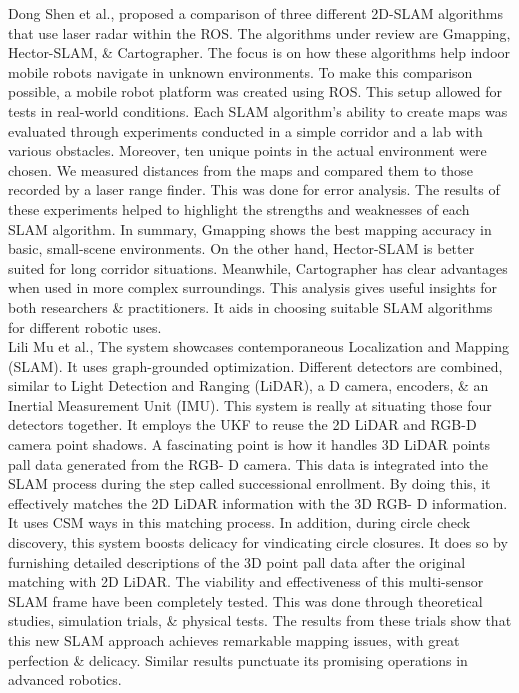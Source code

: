 {		Dong Shen et al., proposed a comparison of three different 2D-SLAM algorithms that use
		laser radar within the ROS. The algorithms under review are Gmapping, Hector-SLAM, \&
		Cartographer. The focus is on how these algorithms help indoor mobile robots navigate in
		unknown environments. To make this comparison possible, a mobile robot platform was
		created using ROS. This setup allowed for tests in real-world conditions. Each SLAM
		algorithm's ability to create maps was evaluated through experiments conducted in a simple
		corridor and a lab with various obstacles. Moreover, ten unique points in the actual
		environment were chosen. We measured distances from the maps and compared them to those
		recorded by a laser range finder. This was done for error analysis. The results of these
		experiments helped to highlight the strengths and weaknesses of each SLAM algorithm. In
		summary, Gmapping shows the best mapping accuracy in basic, small-scene environments. On
		the other hand, Hector-SLAM is better suited for long corridor situations. Meanwhile,
		Cartographer has clear advantages when used in more complex surroundings. This analysis
		gives useful insights for both researchers \& practitioners. It aids in choosing suitable SLAM
		algorithms for different robotic uses. \cite{3351966}\\
		
		Lili Mu et al., The system showcases contemporaneous Localization and Mapping (SLAM).
		It uses graph-grounded optimization. Different detectors are combined, similar to Light
		Detection and Ranging (LiDAR), a D camera, encoders, \& an Inertial Measurement Unit
		(IMU). This system is really at situating those four detectors together. It employs the UKF to
		reuse the 2D LiDAR and RGB-D camera point shadows. A fascinating point is how it handles
		3D LiDAR points pall data generated from the RGB- D camera. This data is integrated into the
		SLAM process during the step called successional enrollment. By doing this, it effectively
		matches the 2D LiDAR information with the 3D RGB- D information. It uses CSM ways in
		this matching process. In addition, during circle check discovery, this system boosts delicacy
		for vindicating circle closures. It does so by furnishing detailed descriptions of the 3D point
		pall data after the original matching with 2D LiDAR. The viability and effectiveness of this
		multi-sensor SLAM frame have been completely tested. This was done through theoretical
		studies, simulation trials, \& physical tests. The results from these trials show that this new
		SLAM approach achieves remarkable mapping issues, with great perfection \& delicacy.
		Similar results punctuate its promising operations in advanced robotics. \cite{9178302}\\
		
}
